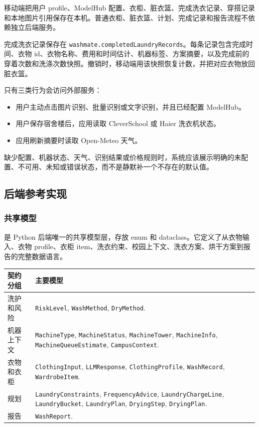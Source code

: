 \documentclass[11pt,a4paper]{ctexart}
\begin{document}
移动端把用户 profile、ModelHub 配置、衣柜、脏衣篮、完成洗衣记录、穿搭记录和本地图片引用保存在本机。普通衣柜、脏衣篮、计划、完成记录和报告流程不依赖独立后端服务。

完成洗衣记录保存在 \texttt{washmate.completedLaundryRecords}。每条记录包含完成时间、衣物 id、衣物名称、费用和时间估计、机器标签、方案摘要，以及完成前的穿着次数和洗涤次数快照。撤销时，移动端用该快照恢复计数，并把对应衣物放回脏衣篮。

只有三类行为会访问外部服务：

\begin{itemize}
  \item 用户主动点击图片识别、批量识别或文字识别，并且已经配置 ModelHub。
  \item 用户保存宿舍楼后，应用读取 CleverSchool 或 Haier 洗衣机状态。
  \item 应用刷新摘要时读取 Open-Meteo 天气。
\end{itemize}

缺少配置、机器状态、天气、识别结果或价格规则时，系统应该展示明确的未配置、不可用、未知或错误状态，而不是静默补一个不存在的默认值。

\subsection{后端参考实现}

\subsubsection{共享模型}

 是 Python 后端唯一的共享模型层，存放 enum 和 dataclass。它定义了从衣物输入、衣物 profile、衣柜 item、洗衣约束、校园上下文、洗衣方案、烘干方案到报告的完整数据语言。

\begin{longtable}{p{} p{}}
\toprule
契约分组 & 主要模型 \\
\midrule
洗护和风险 & \texttt{RiskLevel}, \texttt{WashMethod}, \texttt{DryMethod}. \\
机器上下文 & \texttt{MachineType}, \texttt{MachineStatus}, \texttt{MachineTower}, \texttt{MachineInfo}, \texttt{MachineQueueEstimate}, \texttt{CampusContext}. \\
衣物和衣柜 & \texttt{ClothingInput}, \texttt{LLMResponse}, \texttt{ClothingProfile}, \texttt{WashRecord}, \texttt{WardrobeItem}. \\
规划 & \texttt{LaundryConstraints}, \texttt{FrequencyAdvice}, \texttt{LaundryChargeLine}, \texttt{LaundryBucket}, \texttt{LaundryPlan}, \texttt{DryingStep}, \texttt{DryingPlan}. \\
报告 & \texttt{WashReport}. \\
\bottomrule
\end{longtable}
\end{document}
